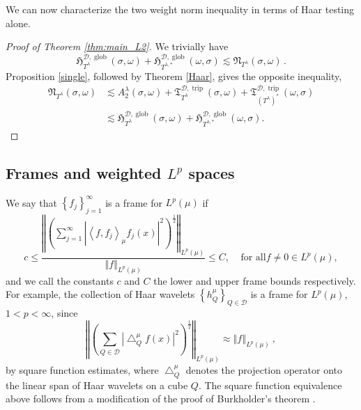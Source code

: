 \documentclass{amsart}%
\theoremstyle{plain}
\numberwithin{equation}{section}
\begin{document}
We can now characterize the two weight norm inequality in terms of Haar testing alone.

\begin{proof}
[Proof of Theorem \ref{thm:main_L2}] We trivially have 
	\[
		\mathfrak{H}
_{T^{\lambda}}^{\mathcal{D},\operatorname*{glob}}\left(  \sigma,\omega\right)
 + \mathfrak{H}_{T^{\lambda,\ast}}^{\mathcal{D},\operatorname*{glob}}\left(
\omega,\sigma\right)  \lesssim \mathfrak{N}_{T^{\lambda}}\left(  \sigma
,\omega\right) \, .
	\]
Proposition \ref{single}, followed by Theorem \ref{Haar},
gives the opposite inequality,%
\begin{align*}
\mathfrak{N}_{T^{\lambda}}\left(  \sigma,\omega\right)   &  \lesssim
A_{2}^{\lambda}\left(  \sigma,\omega\right)  +\mathfrak{T}_{T^{\lambda}%
}^{\mathcal{D},\operatorname*{trip}}\left(  \sigma,\omega\right)
+\mathfrak{T}_{\left(  T^{\lambda}\right)  ^{\ast}}^{\mathcal{D}%
,\operatorname*{trip}}\left(  \omega,\sigma\right) \\
&  \lesssim\mathfrak{H}_{T^{\lambda}}^{\mathcal{D},\operatorname*{glob}%
}\left(  \sigma,\omega\right)  +\mathfrak{H}_{T^{\lambda,\ast}}^{\mathcal{D}%
,\operatorname*{glob}}\left(  \omega,\sigma\right)  .
\end{align*}

\end{proof}

\subsection{Frames and weighted $L^{p}$ spaces}

\label{subsection:frames_weighted_Lp}
We say that $\left\{  f_{j}\right\}
_{j=1}^{\infty}$ is a frame for $L^{p}\left(  \mu\right)  $ if%
\begin{equation}
c\leq\frac{\left\Vert \left(  \sum_{j=1}^{\infty}\left\vert \left\langle
f,f_{j}\right\rangle _{\mu}f_{j}\left(  x\right)  \right\vert ^{2}\right)
^{\frac{1}{2}}\right\Vert _{L^{p}\left(  \mu\right)  }}{\left\Vert
f\right\Vert _{L^{p}\left(  \mu\right)  }}\leq C,\ \ \ \ \ \text{for all
}f\neq0\in L^{p}\left(  \mu\right)  ,\label{def frame LP}%
\end{equation}
and we call the constants $c$ and $C$ the lower and upper frame bounds
respectively. For example, the collection of Haar wavelets $\left\{
h_{Q}^{\mu}\right\}  _{Q\in\mathcal{D}}$ is a frame for $L^{p}\left(
\mu\right)  $, $1<p<\infty$, since%
\[
\left\Vert \left(  \sum_{Q\in\mathcal{D}}\left\vert \bigtriangleup_{Q}^{\mu
}f\left(  x\right)  \right\vert ^{2}\right)  ^{\frac{1}{2}}\right\Vert
_{L^{p}\left(  \mu\right)  }\approx\left\Vert f\right\Vert _{L^{p}\left(
\mu\right)  }\ ,
\]
by square function estimates, where $\bigtriangleup_{Q}^{\mu}$ denotes the
projection operator onto the linear span of Haar wavelets on a cube
$Q$. The square function equivalence above follows from a modification of the proof of Burkholder's theorem \cite[Section 3.1]{SaWi}.
\end{document}
